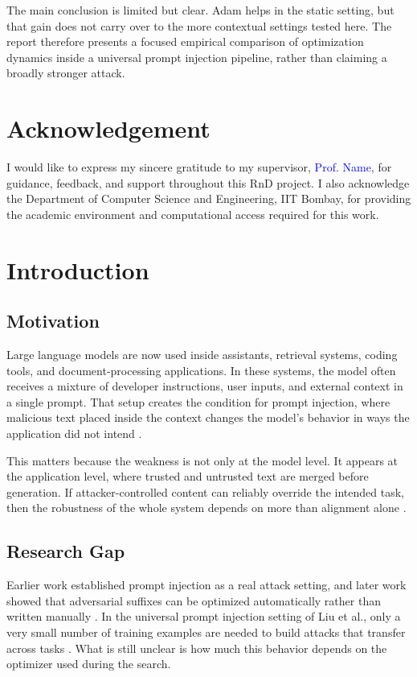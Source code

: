 \documentclass[12pt,a4paper]{report}
\begin{document}
The main conclusion is limited but clear. Adam helps in the static setting, but that gain does not carry over to the more contextual settings tested here. The report therefore presents a focused empirical comparison of optimization dynamics inside a universal prompt injection pipeline, rather than claiming a broadly stronger attack.

\chapter*{Acknowledgement}
I would like to express my sincere gratitude to my supervisor, \textcolor{blue}{Prof. Name}, for guidance, feedback, and support throughout this RnD project. I also acknowledge the Department of Computer Science and Engineering, IIT Bombay, for providing the academic environment and computational access required for this work.

\tableofcontents
\listoftables
\clearpage
{}

\chapter{Introduction}
\section{Motivation}
Large language models are now used inside assistants, retrieval systems, coding tools, and document-processing applications. In these systems, the model often receives a mixture of developer instructions, user inputs, and external context in a single prompt. That setup creates the condition for prompt injection, where malicious text placed inside the context changes the model's behavior in ways the application did not intend \cite{perez2022promptinject,liu2024upi}.

This matters because the weakness is not only at the model level. It appears at the application level, where trusted and untrusted text are merged before generation. If attacker-controlled content can reliably override the intended task, then the robustness of the whole system depends on more than alignment alone \cite{perez2022promptinject}.

\section{Research Gap}
Earlier work established prompt injection as a real attack setting, and later work showed that adversarial suffixes can be optimized automatically rather than written manually \cite{perez2022promptinject,zou2023gcg,liu2024upi}. In the universal prompt injection setting of Liu et al., only a very small number of training examples are needed to build attacks that transfer across tasks \cite{liu2024upi}. What is still unclear is how much this behavior depends on the optimizer used during the search.
\end{document}
